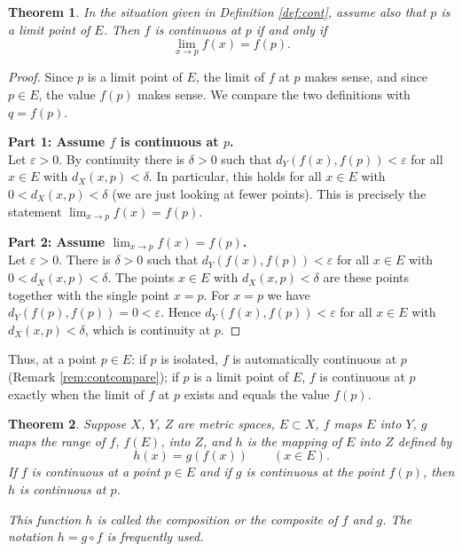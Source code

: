 \documentclass{article}
\theoremstyle{mythm}
\newtheorem{theorem}{Theorem}[section]
\begin{document}
\begin{theorem}\label{thm:contlimit}
In the situation given in Definition \ref{def:cont}, assume also that $p$ is a limit point of $E$. Then $f$ is continuous at $p$ if and only if
\[
\lim_{x \to p} f(x) = f(p).
\]
\end{theorem}

\begin{proof}
Since $p$ is a limit point of $E$, the limit of $f$ at $p$ makes sense, and since $p \in E$, the value $f(p)$ makes sense. We compare the two definitions with $q = f(p)$.

\textbf{Part 1: Assume $f$ is continuous at $p$.}\\
Let $\varepsilon > 0$. By continuity there is $\delta > 0$ such that $d_Y(f(x), f(p)) < \varepsilon$ for all $x \in E$ with $d_X(x,p) < \delta$. In particular, this holds for all $x \in E$ with $0 < d_X(x,p) < \delta$ (we are just looking at fewer points). This is precisely the statement $\lim_{x\to p} f(x) = f(p)$.

\textbf{Part 2: Assume $\lim_{x\to p} f(x) = f(p)$.}\\
Let $\varepsilon > 0$. There is $\delta > 0$ such that $d_Y(f(x), f(p)) < \varepsilon$ for all $x \in E$ with $0 < d_X(x,p) < \delta$. The points $x \in E$ with $d_X(x,p) < \delta$ are these points together with the single point $x = p$. For $x = p$ we have $d_Y(f(p), f(p)) = 0 < \varepsilon$. Hence $d_Y(f(x), f(p)) < \varepsilon$ for all $x \in E$ with $d_X(x,p) < \delta$, which is continuity at $p$.
\end{proof}

Thus, at a point $p \in E$: if $p$ is isolated, $f$ is automatically continuous at $p$ (Remark \ref{rem:contcompare}); if $p$ is a limit point of $E$, $f$ is continuous at $p$ exactly when the limit of $f$ at $p$ exists and equals the value $f(p)$.

\begin{theorem}\label{thm:composition}
Suppose $X$, $Y$, $Z$ are metric spaces, $E \subset X$, $f$ maps $E$ into $Y$, $g$ maps the range of $f$, $f(E)$, into $Z$, and $h$ is the mapping of $E$ into $Z$ defined by
\[
h(x) = g(f(x)) \qquad (x \in E).
\]
If $f$ is continuous at a point $p \in E$ and if $g$ is continuous at the point $f(p)$, then $h$ is continuous at $p$.

This function $h$ is called the \textit{composition} or the \textit{composite} of $f$ and $g$. The notation $h = g \circ f$ is frequently used.
\end{theorem}
\end{document}
